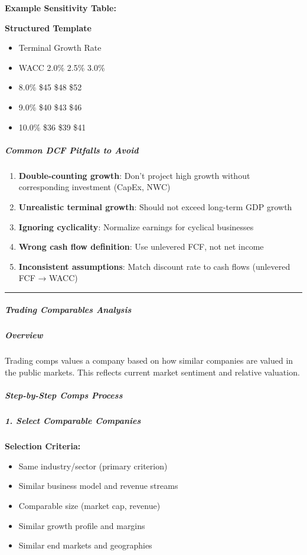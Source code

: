 \documentclass[11pt]{article}
\begin{document}
\textbf{Example Sensitivity Table:}

\textbf{Structured Template}
\begin{itemize}[leftmargin=*,itemsep=2pt,topsep=2pt]
\item {} Terminal Growth Rate
\item {} WACC 2.0\% 2.5\% 3.0\%
\item {} 8.0\% \$45 \$48 \$52
\item {} 9.0\% \$40 \$43 \$46
\item {} 10.0\% \$36 \$39 \$41
\end{itemize}

\subparagraph{Common DCF Pitfalls to Avoid}\mbox{}\par

\begin{enumerate}[leftmargin=*,itemsep=2pt,topsep=2pt]
\item {} \textbf{Double-counting growth}: Don't project high growth without corresponding investment (CapEx, NWC)
\item {} \textbf{Unrealistic terminal growth}: Should not exceed long-term GDP growth
\item {} \textbf{Ignoring cyclicality}: Normalize earnings for cyclical businesses
\item {} \textbf{Wrong cash flow definition}: Use unlevered FCF, not net income
\item {} \textbf{Inconsistent assumptions}: Match discount rate to cash flows (unlevered FCF → WACC)
\end{enumerate}

\vspace{0.5em}\hrule\vspace{0.5em}

\subparagraph{Trading Comparables Analysis}\mbox{}\par

\subparagraph{Overview}\mbox{}\par

Trading comps values a company based on how similar companies are valued in the public markets. This reflects current market sentiment and relative valuation.


\subparagraph{Step-by-Step Comps Process}\mbox{}\par

\subparagraph{1. Select Comparable Companies}\mbox{}\par

\textbf{Selection Criteria:}

\begin{itemize}[leftmargin=*,itemsep=2pt,topsep=2pt]
\item {} Same industry/sector (primary criterion)
\item {} Similar business model and revenue streams
\item {} Comparable size (market cap, revenue)
\item {} Similar growth profile and margins
\item {} Similar end markets and geographies
\end{itemize}
\end{document}
